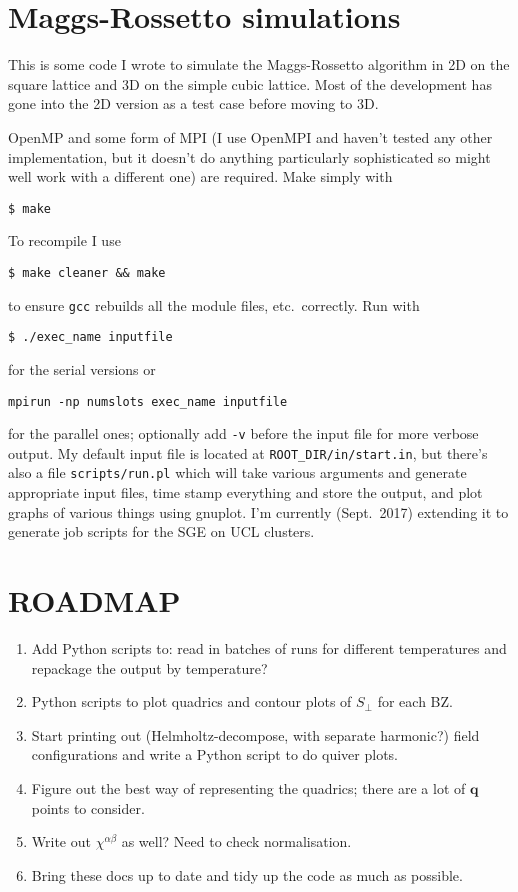 \documentclass{article}
\begin{document}
\section*{Maggs-Rossetto simulations}

This is some code I wrote to simulate the Maggs-Rossetto algorithm in 2D on the square lattice and 3D on the simple cubic lattice.
Most of the development has gone into the 2D version as a test case before moving to 3D.

OpenMP and some form of MPI (I use OpenMPI and haven't tested any other implementation, but it doesn't do anything particularly sophisticated so might well work with a different one) are required.
Make simply with
\begin{verbatim}
$ make
\end{verbatim}
To recompile I use \begin{verbatim}
$ make cleaner && make
\end{verbatim}
to ensure \texttt{gcc} rebuilds all the module files, etc.\ correctly.
Run with
\begin{verbatim}
$ ./exec_name inputfile
\end{verbatim}
for the serial versions or
\begin{verbatim}
mpirun -np numslots exec_name inputfile
\end{verbatim}
for the parallel ones; optionally add \texttt{-v} before the input file for more verbose output.
My default input file is located at \texttt{ROOT{\_}DIR/in/start.in}, but there's also a file \texttt{scripts/run.pl} which will take various arguments and generate appropriate input files, time stamp everything and store the output, and plot graphs of various things using gnuplot.
I'm currently (Sept.\ 2017) extending it to generate job scripts for the SGE on UCL clusters.

\section*{ROADMAP}

\begin{enumerate}
  \item Add Python scripts to: read in batches of runs for different temperatures and repackage the output by temperature?
  \item Python scripts to plot quadrics and contour plots of $ S_{\perp} $ for each BZ.
  \item Start printing out (Helmholtz-decompose, with separate harmonic?) field configurations and write a Python script to do quiver plots.
  \item Figure out the best way of representing the quadrics; there are a lot of $ \mathbf{q} $ points to consider.
  \item Write out $ \chi^{\alpha\beta} $ as well? Need to check normalisation.
  \item Bring these docs up to date and tidy up the code as much as possible.
\end{enumerate}
\end{document}

